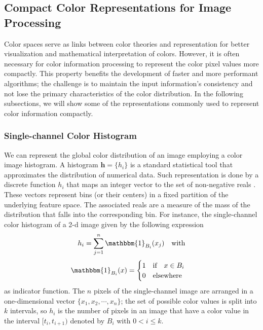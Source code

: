 \subsection{Compact Color Representations for Image Processing}

Color spaces serve as links between color theories and representation for better visualization and mathematical interpretation of colors. However, it is often necessary for color information processing to represent the color pixel values more compactly. This property benefits the development of faster and more performant algorithms; the challenge is to maintain the input information's consistency and not lose the primary characteristics of the color distribution. In the following subsections, we will show some of the representations commonly used to represent color information compactly.

\subsubsection{Single-channel Color Histogram}
We can represent the global color distribution of an image employing a color image histogram. A histogram $\mathbf{h}= \{h_i\}$ is a standard statistical tool that approximates the distribution of numerical data. Such representation is done by a discrete function $h_i$ that maps an integer vector to the set of non-negative reals \citep{Scott:Book:2008}. These vectors represent bins (or their centers) in a fixed partition of the underlying feature space. The associated reals are a measure of the mass of the distribution that falls into the corresponding bin. For instance, the single-channel color histogram of a 2-d image given by the following expression
\begin{equation}\label{eq:single_channel_histogram}
    h_i = \sum_{j=1}^{n}  \mathbbm{1}_{B_i}(x_j) \quad \textrm{with} 
\end{equation}
\begin{equation}\nonumber
    \mathbbm{1}_{B_i}(x) = 
    \begin{cases} 
      1 \quad \textrm{if} \quad x \in B_i \\
      0 \quad \textrm{elsewhere}        
   	 \end{cases} 
\end{equation}
as indicator function. The $n$ pixels of the single-channel image are arranged in a one-dimensional vector $\{x_1, x_2, \cdots, x_n\}$; the set of possible color values is split into $k$ intervals, so $h_i$ is the number of pixels in an image that have a color value in the interval $[t_i, t_{i+1})$ denoted by $B_i$ with $0 < i \leq k$.

